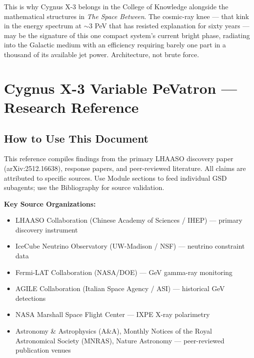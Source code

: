 \documentclass[11pt,letterpaper]{article}
\newcommand{\stageheader}[2]{%
  \noindent\colorbox{#2}{\makebox[\textwidth][l]{%
    \textcolor{white}{\bfseries\sffamily\hspace{6pt}#1\hspace{6pt}}}}%
  \vspace{0.5em}\par%
}
\begin{document}
This is why Cygnus X-3 belongs in the College of Knowledge alongside the mathematical structures in \emph{The Space Between}. The cosmic-ray knee --- that kink in the energy spectrum at $\sim$3 PeV that has resisted explanation for sixty years --- may be the signature of this one compact system's current bright phase, radiating into the Galactic medium with an efficiency requiring barely one part in a thousand of its available jet power. Architecture, not brute force.

\newpage
\stageheader{STAGE 2 --- RESEARCH REFERENCE}{secondary}

\section{Cygnus X-3 Variable PeVatron --- Research Reference}

\subsection{How to Use This Document}

This reference compiles findings from the primary LHAASO discovery paper (arXiv:2512.16638), response papers, and peer-reviewed literature. All claims are attributed to specific sources. Use Module sections to feed individual GSD subagents; use the Bibliography for source validation.

\textbf{Key Source Organizations:}
\begin{itemize}[noitemsep]
  \item LHAASO Collaboration (Chinese Academy of Sciences / IHEP) --- primary discovery instrument
  \item IceCube Neutrino Observatory (UW-Madison / NSF) --- neutrino constraint data
  \item Fermi-LAT Collaboration (NASA/DOE) --- GeV gamma-ray monitoring
  \item AGILE Collaboration (Italian Space Agency / ASI) --- historical GeV detections
  \item NASA Marshall Space Flight Center --- IXPE X-ray polarimetry
  \item Astronomy \& Astrophysics (A\&A), Monthly Notices of the Royal Astronomical Society (MNRAS), Nature Astronomy --- peer-reviewed publication venues
\end{itemize}
\end{document}
